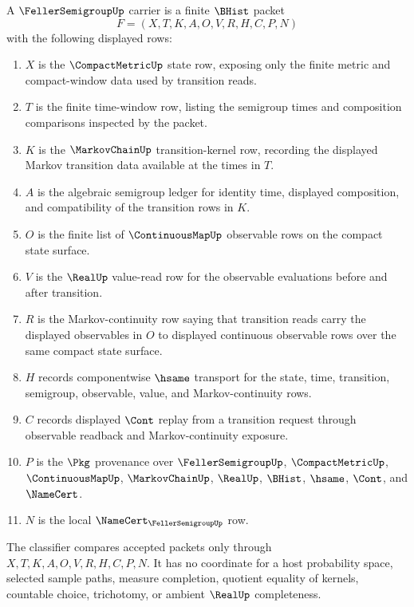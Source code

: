 \begin{definition}
\label{def:feller-semigroup-carrier}
A $\FellerSemigroupUp$ carrier is a finite $\BHist$ packet
$$
F=(X,T,K,A,O,V,R,H,C,P,N)
$$
with the following displayed rows:
\begin{enumerate}
\item $X$ is the $\CompactMetricUp$ state row, exposing only the finite metric and compact-window data used by transition reads.
\item $T$ is the finite time-window row, listing the semigroup times and composition comparisons inspected by the packet.
\item $K$ is the $\MarkovChainUp$ transition-kernel row, recording the displayed Markov transition data available at the times in $T$.
\item $A$ is the algebraic semigroup ledger for identity time, displayed composition, and compatibility of the transition rows in $K$.
\item $O$ is the finite list of $\ContinuousMapUp$ observable rows on the compact state surface.
\item $V$ is the $\RealUp$ value-read row for the observable evaluations before and after transition.
\item $R$ is the Markov-continuity row saying that transition reads carry the displayed observables in $O$ to displayed continuous observable rows over the same compact state surface.
\item $H$ records componentwise $\hsame$ transport for the state, time, transition, semigroup, observable, value, and Markov-continuity rows.
\item $C$ records displayed $\Cont$ replay from a transition request through observable readback and Markov-continuity exposure.
\item $P$ is the $\Pkg$ provenance over $\FellerSemigroupUp$, $\CompactMetricUp$, $\ContinuousMapUp$, $\MarkovChainUp$, $\RealUp$, $\BHist$, $\hsame$, $\Cont$, and $\NameCert$.
\item $N$ is the local $\NameCert_{\FellerSemigroupUp}$ row.
\end{enumerate}
The classifier compares accepted packets only through $X,T,K,A,O,V,R,H,C,P,N$. It has no coordinate for a host probability space, selected sample paths, measure completion, quotient equality of kernels, countable choice, trichotomy, or ambient $\RealUp$ completeness.
\end{definition}

